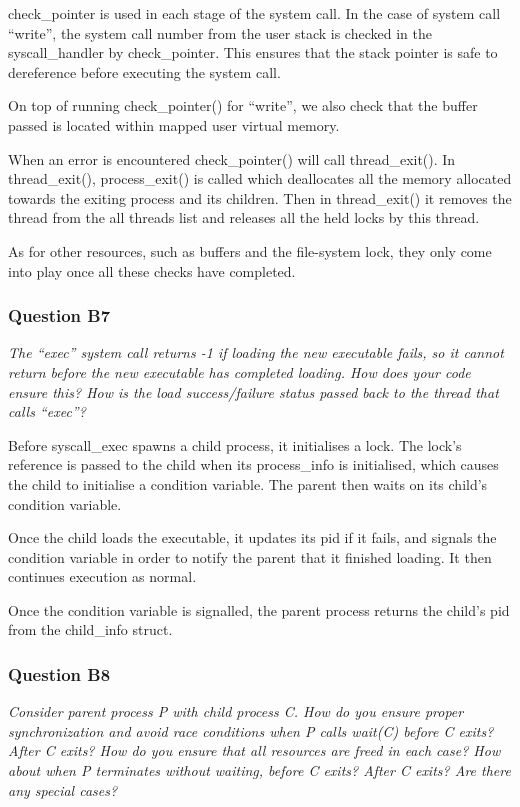 check\_pointer is used in each stage of the system call. In the case of system call ``write'', the system call number from the user stack is checked in the syscall\_handler by check\_pointer. This ensures that the stack pointer is safe to dereference before executing the system call.

On top of running check\_pointer() for ``write'', we also check that the buffer passed is located within mapped user virtual memory.

When an error is encountered check\_pointer() will call thread\_exit(). In thread\_exit(), process\_exit() is called which deallocates all the memory allocated towards the exiting process and its children.
Then in thread\_exit() it removes the thread from the all threads list and releases all the held locks by this thread.

As for other resources, such as buffers and the file-system lock, they only come into play once all these checks have completed.

\subsubsection*{Question B7} %
\textit{The ``exec'' system call returns -1 if loading the new executable fails, so it cannot return before the new executable has completed loading.  How does your code ensure this?  How is the load success/failure status passed back to the thread that calls ``exec''?}

Before syscall\_exec spawns a child process, it initialises a lock. The lock's reference is passed to the child when its process\_info is initialised, which causes the child to initialise a condition variable. The parent then waits on its child's condition variable.

Once the child loads the executable, it updates its pid if it fails, and signals the condition variable in order to notify the parent that it finished loading. It then continues execution as normal.

Once the condition variable is signalled, the parent process returns the child's pid from the child\_info struct.

\subsubsection*{Question B8} %
\textit{Consider parent process P with child process C.  How do you ensure proper synchronization and avoid race conditions when P calls wait(C) before C exits?  After C exits?  How do you ensure that all resources are freed in each case?  How about when P terminates without waiting, before C exits?  After C exits?  Are there any special cases?}

